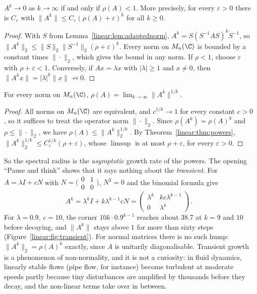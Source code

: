 \begin{theorem}\label{linear:thm:powers}
$A^k\to0$ as $k\to\infty$ if and only if $\rho(A)<1$. More precisely, for every $\varepsilon>0$ there is $C_\varepsilon$ with
$\|A^k\|\le C_\varepsilon(\rho(A)+\varepsilon)^k$ for all $k\ge0$.
\end{theorem}
\begin{proof}
With $S$ from Lemma~\ref{linear:lem:adaptednorm}, $A^k=S(S^{-1}AS)^kS^{-1}$, so $\|A^k\|_2\le\|S\|_2\|S^{-1}\|_2(\rho+\varepsilon)^k$. Every norm on
$M_n(\C)$ is bounded by a constant times $\|\cdot\|_2$, which gives the bound in any norm. If $\rho<1$, choose $\varepsilon$ with
$\rho+\varepsilon<1$. Conversely, if $Ax=\lambda x$ with $|\lambda|\ge1$ and $x\ne0$, then $\|A^kx\|=|\lambda|^k\|x\|\not\to0$.
\end{proof}

\begin{theorem}\label{linear:thm:gelfand}
For every norm on $M_n(\C)$, $\displaystyle\rho(A)=\lim_{k\to\infty}\|A^k\|^{1/k}$.
\end{theorem}
\begin{proof}
All norms on $M_n(\C)$ are equivalent, and $c^{1/k}\to1$ for every constant $c>0$, so it suffices to treat the operator norm
$\|\cdot\|_2$. Since $\rho(A^k)=\rho(A)^k$ and $\rho\le\|\cdot\|_2$, we have $\rho(A)\le\|A^k\|_2^{1/k}$. By Theorem~\ref{linear:thm:powers},
$\|A^k\|_2^{1/k}\le C_\varepsilon^{1/k}(\rho+\varepsilon)$, whose $\limsup$ is at most $\rho+\varepsilon$, for every $\varepsilon>0$.
\end{proof}

So the spectral radius is the \emph{asymptotic} growth rate of the powers. The opening ``Pause and think'' shows that it says nothing
about the \emph{transient}. For $A=\lambda I+cN$ with $N=\bigl(\begin{smallmatrix}0&1\\0&0\end{smallmatrix}\bigr)$, $N^2=0$ and the
binomial formula give
\[
A^k=\lambda^kI+k\lambda^{k-1}cN=\begin{pmatrix}\lambda^k&kc\lambda^{k-1}\\0&\lambda^k\end{pmatrix}.
\]
For $\lambda=0.9$, $c=10$, the corner $10k\cdot0.9^{k-1}$ reaches about $38.7$ at $k=9$ and $10$ before decaying, and $\|A^k\|$ stays above
$1$ for more than sixty steps (Figure~\ref{linear:fig:transient}). For normal matrices there is no such hump: $\|A^k\|_2=\rho(A)^k$ exactly,
since $A$ is unitarily diagonalisable. Transient growth is a phenomenon of non-normality, and it is not a curiosity: in fluid
dynamics, linearly stable flows (pipe flow, for instance) become turbulent at moderate speeds partly because tiny disturbances are
amplified by thousands before they decay, and the non-linear terms take over in between.

